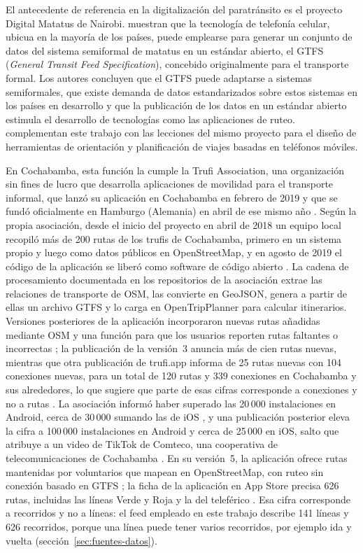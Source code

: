 El antecedente de referencia en la digitalización del paratránsito es el proyecto Digital
Matatus de Nairobi. \textcite{williams2015} muestran que la tecnología de telefonía celular,
ubicua en la mayoría de los países, puede emplearse para generar un conjunto de datos del
sistema semiformal de matatus en un estándar abierto, el GTFS (\textit{General Transit Feed
Specification}), concebido originalmente para el transporte formal. Los autores concluyen
que el GTFS puede adaptarse a sistemas semiformales, que existe demanda de datos
estandarizados sobre estos sistemas en los países en desarrollo y que la publicación de los
datos en un estándar abierto estimula el desarrollo de tecnologías como las aplicaciones de
ruteo. \textcite{klopp2015} complementan este trabajo con las lecciones del mismo proyecto
para el diseño de herramientas de orientación y planificación de viajes basadas en teléfonos
móviles.

En Cochabamba, esta función la cumple la Trufi Association, una organización sin fines de
lucro que desarrolla aplicaciones de movilidad para el transporte informal, que lanzó su
aplicación en Cochabamba en febrero de 2019 y que se fundó oficialmente en Hamburgo
(Alemania) en abril de ese mismo año \parencite{trufi2019}. Según la propia asociación,
desde el inicio del proyecto en abril de 2018 un equipo local recopiló más de 200 rutas de
los trufis de Cochabamba, primero en un sistema propio y luego como datos públicos en
OpenStreetMap, y en agosto de 2019 el código de la aplicación se liberó como software de
código abierto \parencite{trufi2019}. La cadena de procesamiento documentada en los
repositorios de la asociación extrae las relaciones de transporte de OSM, las convierte en
GeoJSON, genera a partir de ellas un archivo GTFS y lo carga en OpenTripPlanner para
calcular itinerarios. Versiones posteriores de la aplicación incorporaron nuevas rutas
añadidas mediante OSM y una función para que los usuarios reporten rutas faltantes o
incorrectas \parencite{trufi-v3}; la publicación de la versión~3 anuncia más de cien rutas
nuevas, mientras que otra publicación de trufi.app informa de 25 rutas nuevas con 104
conexiones nuevas, para un total de 120 rutas y 339 conexiones en Cochabamba y sus
alrededores, lo que sugiere que parte de esas cifras corresponde a conexiones y no a rutas
\parencite{trufiapp-25rutas}. La asociación informó haber superado las 20\,000 instalaciones
en Android, cerca de 30\,000 sumando las de iOS \parencite{trufi-20000}, y una publicación
posterior eleva la cifra a 100\,000 instalaciones en Android y cerca de 25\,000 en iOS, salto
que atribuye a un video de TikTok de Comteco, una cooperativa de telecomunicaciones de
Cochabamba \parencite{trufi-100000}. En su versión~5, la aplicación ofrece rutas mantenidas
por voluntarios que mapean en OpenStreetMap, con ruteo sin conexión basado en GTFS
\parencite{trufi-v5}; la ficha de la aplicación en App Store precisa 626 rutas, incluidas las
líneas Verde y Roja y la del teleférico \parencite{trufi-appstore}. Esa cifra corresponde a
recorridos y no a líneas: el feed empleado en este trabajo describe 141 líneas y 626
recorridos, porque una línea puede tener varios recorridos, por ejemplo ida y vuelta
(sección~\ref{sec:fuentes-datos}).

